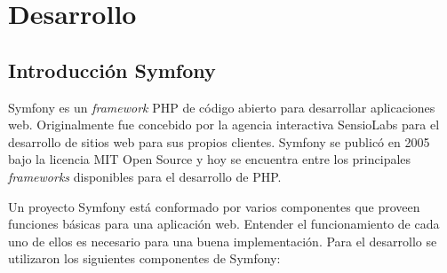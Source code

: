 
\section{Desarrollo}%
\label{sec:desarrollo}


\subsection{Introducción Symfony}%
\label{ssub:introduccion_symfony}
Symfony es un \textit{framework} PHP de código abierto para desarrollar aplicaciones web. Originalmente fue concebido por la
agencia interactiva SensioLabs para el desarrollo de sitios web para sus propios clientes. Symfony se publicó en 2005 bajo
la licencia MIT Open Source y hoy se encuentra entre los principales \textit{frameworks} disponibles para el desarrollo de PHP. \textcite{symfony-def}


Un proyecto Symfony está conformado por varios componentes que proveen funciones básicas para una aplicación web. Entender
el funcionamiento de cada uno de ellos es necesario para una buena implementación. Para el desarrollo se utilizaron los siguientes componentes de Symfony:


\begin{itemize}
    
\end{itemize}
\newpage





\newpage


\newpage


